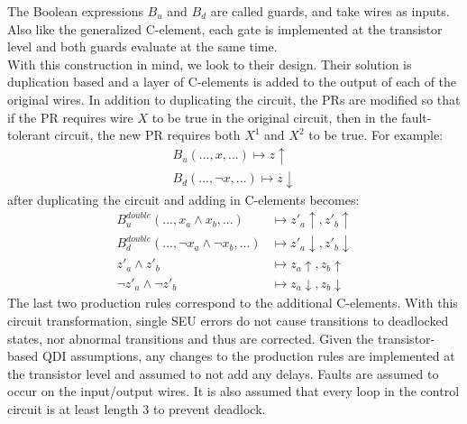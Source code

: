 \documentclass[12pt]{report}
\begin{document}
The Boolean expressions $B_u$ and $B_d$ are called guards, and take wires as inputs.  Also like the generalized C-element, each gate is implemented at the transistor level and both guards evaluate at the same time.\\ 

With this construction in mind, we look to their design.  Their solution is duplication based and a layer of C-elements is added to the output of each of the original wires. In addition to duplicating the circuit, the PRs are modified so that if the PR requires wire $X$ to be true in the original circuit, then in the fault-tolerant circuit, the new PR requires both $X^1$ and $X^2$ to be true. For example:
\begin{align*}
B_u (...,x,...)\mapsto z\uparrow \\
B_d (...,\lnot x,...)\mapsto z\downarrow
\end{align*}
after duplicating the circuit and adding in C-elements becomes:
\begin{align*}
B_u^{double} (...,x_a\wedge x_b,...) & \mapsto z'_a\uparrow, z'_b\uparrow\\
B_d^{double} (...,\lnot x_a\wedge \lnot x_b,...) & \mapsto z'_a\downarrow, z'_b\downarrow\\
z'_a \wedge z'_b& \mapsto z_a\uparrow, z_b\uparrow\\
\lnot z'_a\wedge \lnot z'_b& \mapsto z_a\downarrow, z_b\downarrow
\end{align*}
The last two production rules correspond to the additional C-elements. 
With this circuit transformation, single SEU errors do not cause transitions to deadlocked states, nor abnormal transitions and thus are corrected. Given the transistor-based QDI assumptions, any changes to the production rules are implemented at the transistor level and assumed to not add any delays.  Faults are assumed to occur on the input/output wires.  It is also assumed that every loop in the control circuit is at least length 3 to prevent deadlock. 
\\
\end{document}
